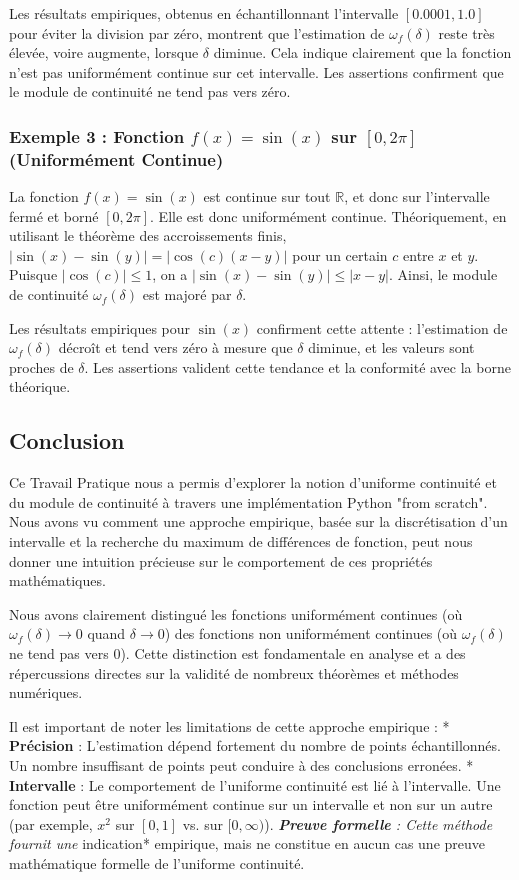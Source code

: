 \documentclass[12pt,a4paper]{report}
\begin{document}
Les résultats empiriques, obtenus en échantillonnant l'intervalle $[0.0001, 1.0]$ pour éviter la division par zéro, montrent que l'estimation de $\omega_f(\delta)$ reste très élevée, voire augmente, lorsque $\delta$ diminue. Cela indique clairement que la fonction n'est pas uniformément continue sur cet intervalle. Les assertions confirment que le module de continuité ne tend pas vers zéro.

\subsubsection{Exemple 3 : Fonction $f(x) = \sin(x)$ sur $[0, 2\pi]$ (Uniformément Continue)}

La fonction $f(x) = \sin(x)$ est continue sur tout $\mathbb{R}$, et donc sur l'intervalle fermé et borné $[0, 2\pi]$. Elle est donc uniformément continue.
Théoriquement, en utilisant le théorème des accroissements finis, $|\sin(x) - \sin(y)| = |\cos(c)(x - y)|$ pour un certain $c$ entre $x$ et $y$. Puisque $|\cos(c)| \le 1$, on a $|\sin(x) - \sin(y)| \le |x - y|$. Ainsi, le module de continuité $\omega_f(\delta)$ est majoré par $\delta$.

Les résultats empiriques pour $\sin(x)$ confirment cette attente : l'estimation de $\omega_f(\delta)$ décroît et tend vers zéro à mesure que $\delta$ diminue, et les valeurs sont proches de $\delta$. Les assertions valident cette tendance et la conformité avec la borne théorique.

\subsection{Conclusion}

Ce Travail Pratique nous a permis d'explorer la notion d'uniforme continuité et du module de continuité à travers une implémentation Python "from scratch". Nous avons vu comment une approche empirique, basée sur la discrétisation d'un intervalle et la recherche du maximum de différences de fonction, peut nous donner une intuition précieuse sur le comportement de ces propriétés mathématiques.

Nous avons clairement distingué les fonctions uniformément continues (où $\omega_f(\delta) \to 0$ quand $\delta \to 0$) des fonctions non uniformément continues (où $\omega_f(\delta)$ ne tend pas vers 0). Cette distinction est fondamentale en analyse et a des répercussions directes sur la validité de nombreux théorèmes et méthodes numériques.

Il est important de noter les limitations de cette approche empirique :
*   \textbf{Précision} : L'estimation dépend fortement du nombre de points échantillonnés. Un nombre insuffisant de points peut conduire à des conclusions erronées.
*   \textbf{Intervalle} : Le comportement de l'uniforme continuité est lié à l'intervalle. Une fonction peut être uniformément continue sur un intervalle et non sur un autre (par exemple, $x^2$ sur $[0, 1]$ vs. sur $[0, \infty)$).
\textit{   \textbf{Preuve formelle} : Cette méthode fournit une }indication* empirique, mais ne constitue en aucun cas une preuve mathématique formelle de l'uniforme continuité.
\end{document}
